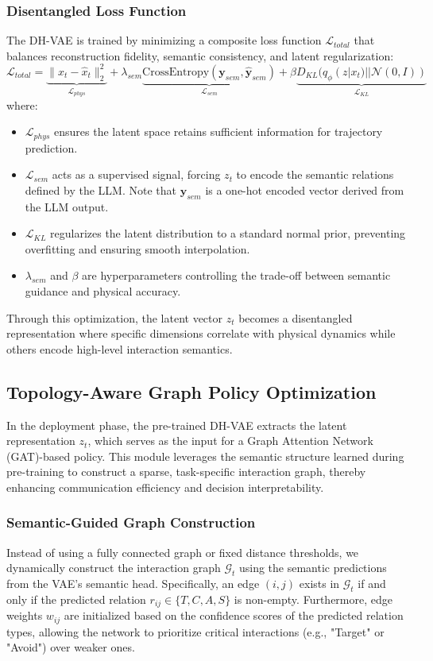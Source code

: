\documentclass[conference]{IEEEtran}
\begin{document}
\subsubsection{Disentangled Loss Function}
The DH-VAE is trained by minimizing a composite loss function $\mathcal{L}_{total}$ that balances reconstruction fidelity, semantic consistency, and latent regularization:
\begin{equation}
    \mathcal{L}_{total} = \underbrace{\| x_t - \hat{x}_t \|_2^2}_{\mathcal{L}_{phys}} + \lambda_{sem} \underbrace{\text{CrossEntropy}(\mathbf{y}_{sem}, \hat{\mathbf{y}}_{sem})}_{\mathcal{L}_{sem}} + \beta \underbrace{D_{KL}(q_\phi(z|x_t) || \mathcal{N}(0, I))}_{\mathcal{L}_{KL}}
\end{equation}
where:
\begin{itemize}
    \item $\mathcal{L}_{phys}$ ensures the latent space retains sufficient information for trajectory prediction.
    \item $\mathcal{L}_{sem}$ acts as a supervised signal, forcing $z_t$ to encode the semantic relations defined by the LLM. Note that $\mathbf{y}_{sem}$ is a one-hot encoded vector derived from the LLM output.
    \item $\mathcal{L}_{KL}$ regularizes the latent distribution to a standard normal prior, preventing overfitting and ensuring smooth interpolation.
    \item $\lambda_{sem}$ and $\beta$ are hyperparameters controlling the trade-off between semantic guidance and physical accuracy.
\end{itemize}
Through this optimization, the latent vector $z_t$ becomes a disentangled representation where specific dimensions correlate with physical dynamics while others encode high-level interaction semantics.

\subsection{Topology-Aware Graph Policy Optimization}

In the deployment phase, the pre-trained DH-VAE extracts the latent representation $z_t$, which serves as the input for a Graph Attention Network (GAT)-based policy. This module leverages the semantic structure learned during pre-training to construct a sparse, task-specific interaction graph, thereby enhancing communication efficiency and decision interpretability.

\subsubsection{Semantic-Guided Graph Construction}
Instead of using a fully connected graph or fixed distance thresholds, we dynamically construct the interaction graph $\mathcal{G}_t$ using the semantic predictions from the VAE's semantic head. Specifically, an edge $(i, j)$ exists in $\mathcal{G}_t$ if and only if the predicted relation $r_{ij} \in \{T, C, A, S\}$ is non-empty. Furthermore, edge weights $w_{ij}$ are initialized based on the confidence scores of the predicted relation types, allowing the network to prioritize critical interactions (e.g., "Target" or "Avoid") over weaker ones.
\end{document}
